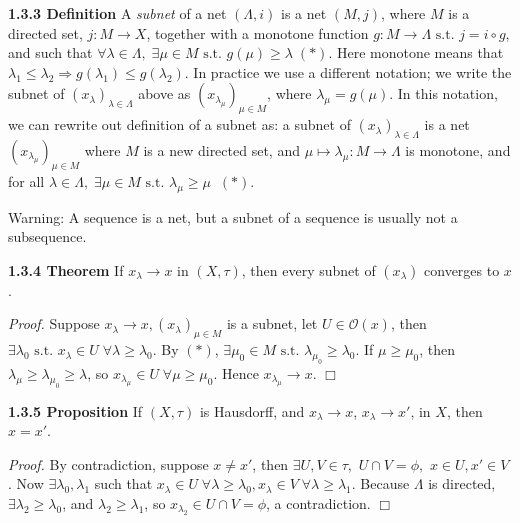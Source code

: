 \documentclass[12pt]{article}
\newcommand{\st}[0]{ \textrm{ s.t. } }
\newcommand{\rimply}[0] { \Rightarrow }
\newcommand{\rarw}[0] { \rightarrow }
\newcommand{\curlyO}[0] { \mathcal{O} }
\begin{document}
\begin{flushleft} {\bf 1.3.3 Definition} A \emph{subnet} of a net $(\Lambda, i)$ is
a net $(M, j)$, where $M$ is a directed set, $j: M \rarw X$, together with a  monotone
function $g: M \rarw \Lambda \st j = i \circ g$, and such that $\forall \lambda \in
 \Lambda, \; \exists \mu \in M \st g(\mu) \ge \lambda \; (*)$. Here monotone means that
 $\lambda_1 \le \lambda_2 \rimply g(\lambda_1) \le g(\lambda_2)$. In practice we use a
 different notation; we write the subnet of $(x_\lambda)_{\lambda \in \Lambda}$ above as
  $(x_{\lambda_\mu}) _{\mu \in M}$, where $\lambda_\mu = g(\mu)$. In this notation, we
   can rewrite out definition of a subnet as: a subnet of $(x_\lambda)_{\lambda \in
   \Lambda}$ is a net $(x_{\lambda_\mu})_{\mu \in M}$ where $M$ is a new directed set,
   and $\mu \mapsto \lambda_\mu: M \rarw \Lambda$ is monotone, and for all $\lambda \in
   \Lambda, \; \exists \mu \in M \st \lambda_\mu \ge \mu \; \; (*)$.
\end{flushleft}

Warning: A sequence is a net, but a subnet of a sequence is usually
not a subsequence.

\begin{flushleft} {\bf 1.3.4 Theorem} If $x_\lambda \rarw x$ in $(X, \tau)$, then every
 subnet of $(x_\lambda)$ converges to $x$.
\end{flushleft}

\begin{flushleft} \emph{Proof. } Suppose $x_\lambda \rarw x, (x_\lambda)_{\mu \in M}$
 is a subnet, let $U \in \curlyO(x)$, then $\exists \lambda_0 \st x_\lambda \in U \;
  \forall \lambda \ge \lambda_0$. By $(*)$, $\exists \mu_0 \in M \st \lambda_{\mu_0}
  \ge \lambda_0$. If $\mu \ge \mu_0$, then $\lambda_\mu \ge \lambda_{\mu_0}
  \ge \lambda$, so $x_{\lambda_\mu} \in U \; \forall \mu \ge \mu_0.$
   Hence
  $x_{\lambda_\mu} \rarw x$.
$\Box$
\end{flushleft}


\begin{flushleft} {\bf 1.3.5 Proposition} If $(X, \tau)$ is Hausdorff, and $x_\lambda \rarw x$, $x_\lambda \rarw x'$, in $X$, then $x = x'$.
\end{flushleft}

\begin{flushleft} \emph{Proof. } By contradiction, suppose $x \not = x'$, then $\exists
 U, V \in \tau,$ $U \cap V = \phi,$ $x \in U, x' \in V$. Now $\exists \lambda_0,
 \lambda_1$ such that $x_\lambda \in U \; \forall \lambda \ge \lambda_0, x_\lambda \in V \; \forall \lambda \ge \lambda_1$. Because $\Lambda$ is directed, $\exists \lambda_2 \ge \lambda_0$, and $\lambda_2 \ge \lambda_1$, so $x_{\lambda_2} \in U \cap V = \phi$, a contradiction. $\Box$
\end{flushleft}
\end{document}
